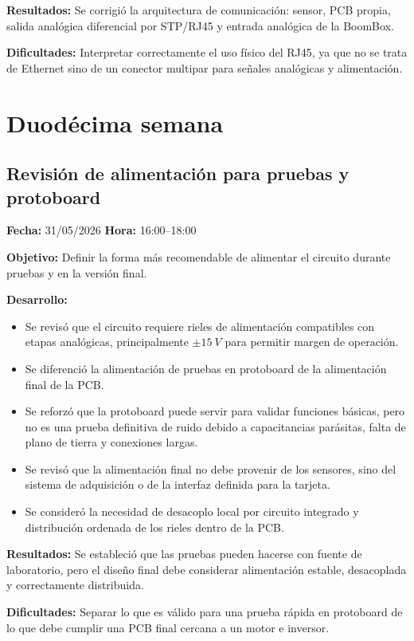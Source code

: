 \documentclass[12pt]{article}
\begin{document}
\textbf{Resultados:}
Se corrigió la arquitectura de comunicación: sensor, PCB propia, salida analógica diferencial por STP/RJ45 y entrada analógica de la BoomBox.

\textbf{Dificultades:}
Interpretar correctamente el uso físico del RJ45, ya que no se trata de Ethernet sino de un conector multipar para señales analógicas y alimentación.

\section{Duodécima semana}

\subsection{Revisión de alimentación para pruebas y protoboard}
\textbf{Fecha:} 31/05/2026 \quad \textbf{Hora:} 16:00--18:00

\textbf{Objetivo:}
Definir la forma más recomendable de alimentar el circuito durante pruebas y en la versión final.

\textbf{Desarrollo:}
\begin{itemize}
\item Se revisó que el circuito requiere rieles de alimentación compatibles con etapas analógicas, principalmente \(\pm\SI{15}{V}\) para permitir margen de operación.
\item Se diferenció la alimentación de pruebas en protoboard de la alimentación final de la PCB.
\item Se reforzó que la protoboard puede servir para validar funciones básicas, pero no es una prueba definitiva de ruido debido a capacitancias parásitas, falta de plano de tierra y conexiones largas.
\item Se revisó que la alimentación final no debe provenir de los sensores, sino del sistema de adquisición o de la interfaz definida para la tarjeta.
\item Se consideró la necesidad de desacoplo local por circuito integrado y distribución ordenada de los rieles dentro de la PCB.
\end{itemize}

\textbf{Resultados:}
Se estableció que las pruebas pueden hacerse con fuente de laboratorio, pero el diseño final debe considerar alimentación estable, desacoplada y correctamente distribuida.

\textbf{Dificultades:}
Separar lo que es válido para una prueba rápida en protoboard de lo que debe cumplir una PCB final cercana a un motor e inversor.
\end{document}
